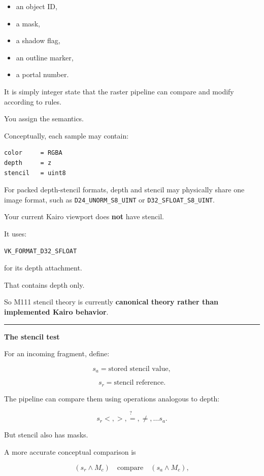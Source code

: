 \begin{itemize}
\tightlist
\item
  an object ID,
\item
  a mask,
\item
  a shadow flag,
\item
  an outline marker,
\item
  a portal number.
\end{itemize}

It is simply integer state that the raster pipeline can compare and modify according to rules.

You assign the semantics.

Conceptually, each sample may contain:

\begin{verbatim}
color     = RGBA
depth     = z
stencil   = uint8
\end{verbatim}

For packed depth-stencil formats, depth and stencil may physically share one image format, such as \texttt{D24\_UNORM\_S8\_UINT} or \texttt{D32\_SFLOAT\_S8\_UINT}.

Your current Kairo viewport does \textbf{not} have stencil.

It uses:

\begin{verbatim}
VK_FORMAT_D32_SFLOAT
\end{verbatim}

for its depth attachment.

That contains depth only.

So M111 stencil theory is currently \textbf{canonical theory rather than implemented Kairo behavior}.

\begin{center}\rule{0.5\linewidth}{0.5pt}\end{center}

\textbf{The stencil test}

For an incoming fragment, define:

\[
s_a = \text{stored stencil value},
\]

\[
s_r = \text{stencil reference}.
\]

The pipeline can compare them using operations analogous to depth:

\[
s_r \stackrel{?}{<,>,=,\neq,\dots} s_a.
\]

But stencil also has masks.

A more accurate conceptual comparison is

\[
(s_r \land M_c)
\quad\text{compare}\quad
(s_a \land M_c),
\]

